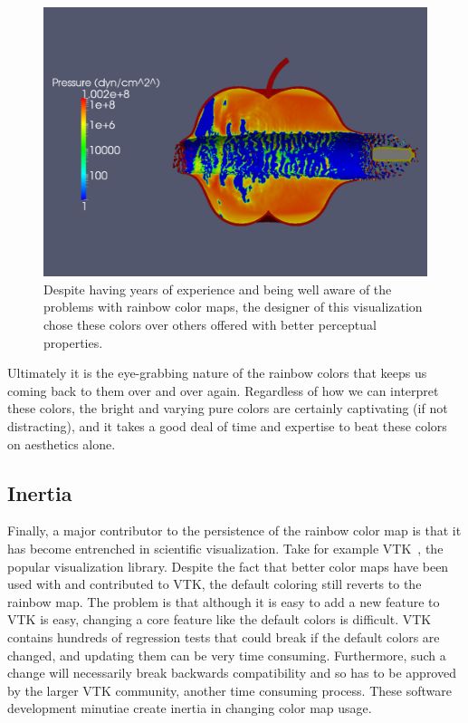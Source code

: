 \documentclass[letterpaper,twocolumn,fleqn]{article}
\newcommand*{\lcite}[1]{~\cite{#1}}
\begin{document}
\begin{figure}[htb]
  \centering
  \includegraphics[width=\linewidth]{images/pres-log-legend-0042}
  \caption{Despite having years of experience and being well aware of the
    problems with rainbow color maps, the designer of this visualization
    chose these colors over others offered with better perceptual
    properties.}
  \label{fig:ExpertRainbowVis}
\end{figure}

Ultimately it is the eye-grabbing nature of the rainbow colors that keeps
us coming back to them over and over again. Regardless of how we can
interpret these colors, the bright and varying pure colors are certainly
captivating (if not distracting), and it takes a good deal of time and
expertise to beat these colors on aesthetics alone.

\subsection{Inertia}

\noindent
Finally, a major contributor to the persistence of the rainbow color map is
that it has become entrenched in scientific visualization. Take for example
VTK\lcite{VTK}, the popular visualization library. Despite the fact that
better color maps have been used with and contributed to VTK, the default
coloring still reverts to the rainbow map. The problem is that although it
is easy to add a new feature to VTK is easy, changing a core feature like
the default colors is difficult. VTK contains hundreds of regression tests
that could break if the default colors are changed, and updating them can
be very time consuming. Furthermore, such a change will necessarily break
backwards compatibility and so has to be approved by the larger VTK
community, another time consuming process. These software development
minutiae create inertia in changing color map usage.
\end{document}
